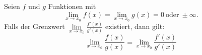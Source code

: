 Seien $f$ und $g$ Funktionen mit
$$\lim\limits_{x \to x_0} f(x) = \lim\limits_{x \to x_0} g(x) = 0 \ \text{oder} \ \pm \infty.$$
Falls der Grenzwert $\lim\limits_{x \to x_0} \frac{f'(x)}{g'(x)}$ existiert, dann gilt:
$$\lim_{x \to x_0} \frac{f(x)}{g(x)} = \lim_{x \to x_0} \frac{f'(x)}{g'(x)}$$